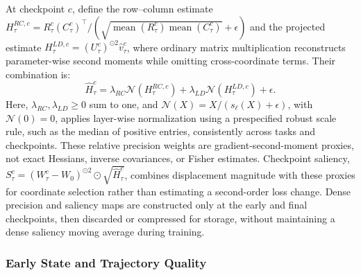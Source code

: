 \documentclass[fleqn,10pt]{wlscirep}
\begin{document}
At checkpoint $c$, define the row--column estimate $H_{\tau}^{RC,c}=R_{\tau}^{c}(C_{\tau}^{c})^{\top}/(\sqrt{\operatorname{mean}(R_{\tau}^{c})\operatorname{mean}(C_{\tau}^{c})}+\epsilon)$ and the projected estimate $H_{\tau}^{LD,c}=(U_{\tau}^{c})^{\odot2}\widehat v_{\tau}^{c}$, where ordinary matrix multiplication reconstructs parameter-wise second moments while omitting cross-coordinate terms. Their combination is:
\begin{equation}
\widehat H_{\tau}^{c}
=\lambda_{RC}\mathcal{N}(H_{\tau}^{RC,c})
+\lambda_{LD}\mathcal{N}(H_{\tau}^{LD,c})+\epsilon.
\label{eq:combined_precision}
\end{equation}
Here, $\lambda_{RC},\lambda_{LD}\geq0$ sum to one, and $\mathcal{N}(X)=X/(s_{\ell}(X)+\epsilon)$, with $\mathcal{N}(0)=0$, applies layer-wise normalization using a prespecified robust scale rule, such as the median of positive entries, consistently across tasks and checkpoints. These relative precision weights are gradient-second-moment proxies, not exact Hessians, inverse covariances, or Fisher estimates. Checkpoint saliency, $S_{\tau}^{c}=(W_{\tau}^{c}-W_0)^{\odot2}\odot\sqrt{\widehat H_{\tau}^{c}}$, combines displacement magnitude with these proxies for coordinate selection rather than estimating a second-order loss change. Dense precision and saliency maps are constructed only at the early and final checkpoints, then discarded or compressed for storage, without maintaining a dense saliency moving average during training.

\subsubsection{Early State and Trajectory Quality}
\label{subsubsec:early_task_vector}
\label{subsubsec:compressed_early_vector}
\label{subsubsec:subspace_stability}
\label{subsubsec:projection_fidelity}
\label{subsubsec:preserved_task_package}
\end{document}
